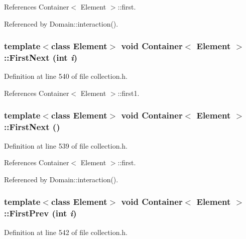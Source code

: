References Container$<$ Element $>$::first.

Referenced by Domain::interaction().\hypertarget{classContainer_b9e873be2839d0adc19fadd5210d4f53}{
\subsubsection[{FirstNext}]{\setlength{\rightskip}{0pt plus 5cm}template$<$class Element$>$ void {\bf Container}$<$ Element $>$::FirstNext (int {\em i})}}
\label{classContainer_b9e873be2839d0adc19fadd5210d4f53}




Definition at line 540 of file collection.h.

References Container$<$ Element $>$::first1.\hypertarget{classContainer_abce5e53a8d9493e4a363766e191653d}{
\subsubsection[{FirstNext}]{\setlength{\rightskip}{0pt plus 5cm}template$<$class Element$>$ void {\bf Container}$<$ Element $>$::FirstNext ()}}
\label{classContainer_abce5e53a8d9493e4a363766e191653d}




Definition at line 539 of file collection.h.

References Container$<$ Element $>$::first.

Referenced by Domain::interaction().\hypertarget{classContainer_6845f750fe81c0366e291a59aabbf0fc}{
\subsubsection[{FirstPrev}]{\setlength{\rightskip}{0pt plus 5cm}template$<$class Element$>$ void {\bf Container}$<$ Element $>$::FirstPrev (int {\em i})}}
\label{classContainer_6845f750fe81c0366e291a59aabbf0fc}




Definition at line 542 of file collection.h.

